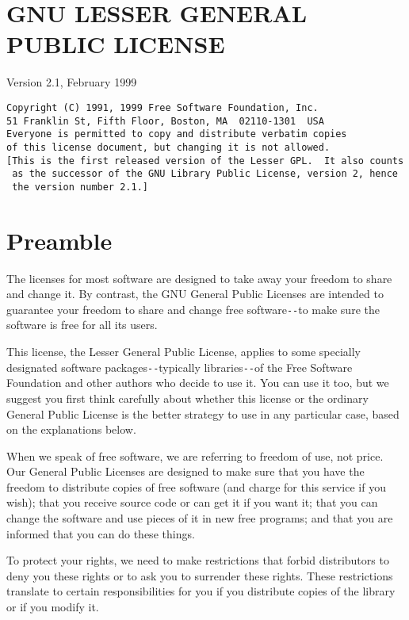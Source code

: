 \section{GNU LESSER GENERAL PUBLIC LICENSE}
\label{SEC12}

Version 2.1, February 1999

\footnotesize
\begin{verbatim}
Copyright (C) 1991, 1999 Free Software Foundation, Inc.
51 Franklin St, Fifth Floor, Boston, MA  02110-1301  USA
Everyone is permitted to copy and distribute verbatim copies
of this license document, but changing it is not allowed.
[This is the first released version of the Lesser GPL.  It also counts
 as the successor of the GNU Library Public License, version 2, hence
 the version number 2.1.]
\end{verbatim}
\normalsize

\section{Preamble}
\label{SEC23}

The licenses for most software are designed to take away your freedom to share
and change it. By contrast, the GNU General Public Licenses are intended to
guarantee your freedom to share and change free software\verb:--:to make sure the
software is free for all its users.

This license, the Lesser General Public License, applies to some specially
designated software packages\verb:--:typically libraries\verb:--:of the Free Software
Foundation and other authors who decide to use it. You can use it too, but we
suggest you first think carefully about whether this license or the ordinary
General Public License is the better strategy to use in any particular case,
based on the explanations below.

When we speak of free software, we are referring to freedom of use, not price.
Our General Public Licenses are designed to make sure that you have the
freedom to distribute copies of free software (and charge for this service if
you wish); that you receive source code or can get it if you want it; that you
can change the software and use pieces of it in new free programs; and that
you are informed that you can do these things.

To protect your rights, we need to make restrictions that forbid distributors
to deny you these rights or to ask you to surrender these rights. These
restrictions translate to certain responsibilities for you if you distribute
copies of the library or if you modify it.

